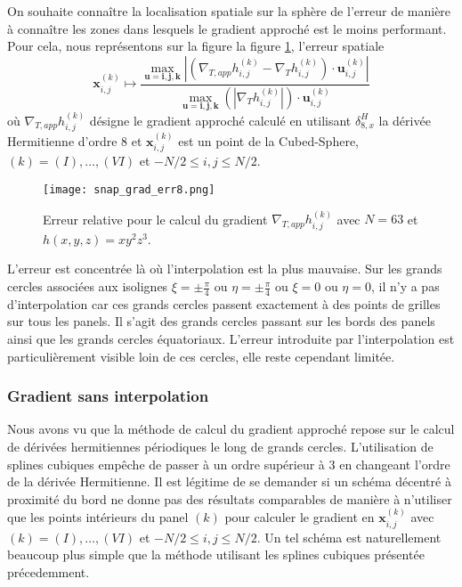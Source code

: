 On souhaite connaître la localisation spatiale sur la sphère de l'erreur de manière à connaître les zones dans lesquels le gradient approché est le moins performant. Pour cela, nous représentons sur la figure la figure \ref{fig:err_grad}, l'erreur spatiale
\begin{equation}
\mathbf{x}_{i,j}^{(k)} \mapsto \dfrac{\max_{\mathbf{u}=\mathbf{i}, \mathbf{j}, \mathbf{k}} | \left( \nabla_{T,app} h_{i,j}^{(k)} - \nabla_T h_{i,j}^{(k)} \right)\cdot \mathbf{u}_{i,j}^{(k)} | }{\max_{\mathbf{u}=\mathbf{i}, \mathbf{j}, \mathbf{k}} \left(  | \nabla_T h_{i,j}^{(k)} |\right)\cdot \mathbf{u}_{i,j}^{(k)}}
\end{equation}
où $\nabla_{T,app} h_{i,j}^{(k)}$ désigne le gradient approché calculé en utilisant $\delta_{8,x}^H$ la dérivée Hermitienne d'ordre 8 et $\mathbf{x}_{i,j}^{(k)}$ est un point de la Cubed-Sphere, $(k)= (I), \ldots , (VI)$ et $-N/2 \leq i,j \leq N/2$.
\begin{figure}[htbp]
\begin{center}
\texttt{[image: snap\_grad\_err8.png]}
\end{center}
\caption{Erreur relative pour le calcul du gradient $\nabla_{T,app} h_{i,j}^{(k)}$ avec $N=63$ et $h(x,y,z)=x y^2 z^3$. }
\label{fig:err_grad}
\end{figure}
L'erreur est concentrée là où l'interpolation est la plus mauvaise. Sur les grands cercles associées aux isolignes $\xi = \pm \frac{\pi}{4}$ ou $\eta = \pm \frac{\pi}{4}$ ou $\xi = 0$ ou $\eta = 0$, il n'y a pas d'interpolation car ces grands cercles passent exactement à des points de grilles sur tous les panels. Il s'agit des grands cercles passant sur les bords des panels ainsi que les grands cercles équatoriaux. L'erreur introduite par l'interpolation est particulièrement visible loin de ces cercles, elle reste cependant limitée.













\subsubsection{Gradient sans interpolation}

Nous avons vu que la méthode de calcul du gradient approché repose sur le calcul de dérivées hermitiennes périodiques le long de grands cercles. L'utilisation de splines cubiques empêche de passer à un ordre supérieur à 3 en changeant l'ordre de la dérivée Hermitienne. Il est légitime de se demander si un schéma décentré à proximité du bord ne donne pas des résultats comparables de manière à n'utiliser que les points intérieurs du panel $(k)$ pour calculer le gradient en $\mathbf{x}_{i,j}^{(k)}$ avec $(k) = (I), \ldots ,(VI)$ et $-N/2 \leq i,j \leq N/2$. Un tel schéma est naturellement beaucoup plus simple que la méthode utilisant les splines cubiques présentée précedemment.

